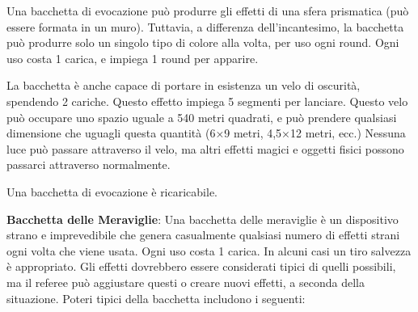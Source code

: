 \documentclass{article}
\begin{document}
\begin{multicols}{2}
Una bacchetta di evocazione può produrre gli effetti di una sfera prismatica (può essere formata in un muro). Tuttavia, a differenza dell'incantesimo, la bacchetta può produrre solo un singolo tipo di colore alla volta, per uso ogni round. Ogni uso costa 1 carica, e impiega 1 round per apparire.

La bacchetta è anche capace di portare in esistenza un velo di oscurità, spendendo 2 cariche. Questo effetto impiega 5 segmenti per lanciare. Questo velo può occupare uno spazio uguale a 540 metri quadrati, e può prendere qualsiasi dimensione che uguagli questa quantità (6×9 metri, 4,5×12 metri, ecc.) Nessuna luce può passare attraverso il velo, ma altri effetti magici e oggetti fisici possono passarci attraverso normalmente.

Una bacchetta di evocazione è ricaricabile.

\textbf{Bacchetta delle Meraviglie}: Una bacchetta delle meraviglie è un dispositivo strano e imprevedibile che genera casualmente qualsiasi numero di effetti strani ogni volta che viene usata. Ogni uso costa 1 carica. In alcuni casi un tiro salvezza è appropriato. Gli effetti dovrebbero essere considerati tipici di quelli possibili, ma il referee può aggiustare questi o creare nuovi effetti, a seconda della situazione. Poteri tipici della bacchetta includono i seguenti:


\end{multicols}
\end{document}
